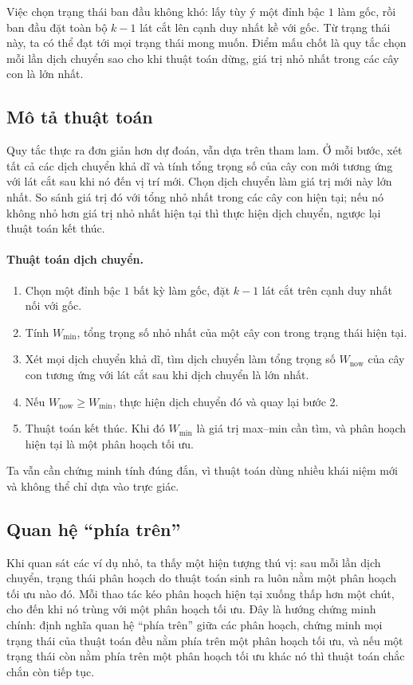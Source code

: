 \documentclass[11pt]{article}
\begin{document}
Việc chọn trạng thái ban đầu không khó: lấy tùy ý một đỉnh bậc $1$ làm gốc,
rồi ban đầu đặt toàn bộ $k-1$ lát cắt lên cạnh duy nhất kề với gốc. Từ trạng
thái này, ta có thể đạt tới mọi trạng thái mong muốn. Điểm mấu chốt là quy
tắc chọn mỗi lần dịch chuyển sao cho khi thuật toán dừng, giá trị nhỏ nhất
trong các cây con là lớn nhất.

\subsection{Mô tả thuật toán}

Quy tắc thực ra đơn giản hơn dự đoán, vẫn dựa trên tham lam. Ở mỗi bước, xét
tất cả các dịch chuyển khả dĩ và tính tổng trọng số của cây con mới tương ứng
với lát cắt sau khi nó đến vị trí mới. Chọn dịch chuyển làm giá trị mới này
lớn nhất. So sánh giá trị đó với tổng nhỏ nhất trong các cây con hiện tại; nếu
nó không nhỏ hơn giá trị nhỏ nhất hiện tại thì thực hiện dịch chuyển, ngược
lại thuật toán kết thúc.

\paragraph{Thuật toán dịch chuyển.}
\begin{enumerate}
  \item Chọn một đỉnh bậc $1$ bất kỳ làm gốc, đặt $k-1$ lát cắt trên cạnh duy
  nhất nối với gốc.
  \item Tính $W_{\min}$, tổng trọng số nhỏ nhất của một cây con trong trạng
  thái hiện tại.
  \item Xét mọi dịch chuyển khả dĩ, tìm dịch chuyển làm tổng trọng số
  $W_{\text{now}}$ của cây con tương ứng với lát cắt sau khi dịch chuyển là
  lớn nhất.
  \item Nếu $W_{\text{now}}\ge W_{\min}$, thực hiện dịch chuyển đó và quay lại
  bước 2.
  \item Thuật toán kết thúc. Khi đó $W_{\min}$ là giá trị max--min cần tìm, và
  phân hoạch hiện tại là một phân hoạch tối ưu.
\end{enumerate}

Ta vẫn cần chứng minh tính đúng đắn, vì thuật toán dùng nhiều khái niệm mới
và không thể chỉ dựa vào trực giác.

\subsection{Quan hệ ``phía trên''}

Khi quan sát các ví dụ nhỏ, ta thấy một hiện tượng thú vị: sau mỗi lần dịch
chuyển, trạng thái phân hoạch do thuật toán sinh ra luôn nằm 
một phân hoạch tối ưu nào đó. Mỗi thao tác kéo phân hoạch hiện tại xuống thấp
hơn một chút, cho đến khi nó trùng với một phân hoạch tối ưu. Đây là hướng
chứng minh chính: định nghĩa quan hệ ``phía trên'' giữa các phân hoạch, chứng
minh mọi trạng thái của thuật toán đều nằm phía trên một phân hoạch tối ưu,
và nếu một trạng thái còn nằm phía trên một phân hoạch tối ưu khác nó thì
thuật toán chắc chắn còn tiếp tục.
\end{document}
